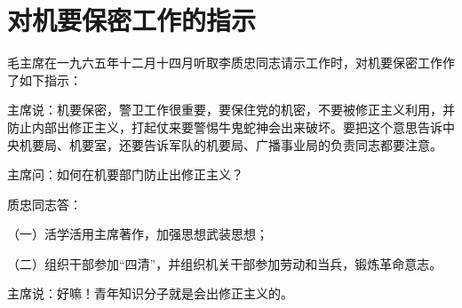 \section[对机要保密工作的指示（一九六五年十二月十四日）]{对机要保密工作的指示}


毛主席在一九六五年十二月十四月听取李质忠同志请示工作时，对机要保密工作作了如下指示：

主席说：机要保密，警卫工作很重要，要保住党的机密，不要被修正主义利用，并防止内部出修正主义，打起仗来要警惕牛鬼蛇神会出来破坏。要把这个意思告诉中央机要局、机要室，还要告诉军队的机要局、广播事业局的负责同志都要注意。

主席问：如何在机要部门防止出修正主义？

质忠同志答：

（一）活学活用主席著作，加强思想武装思想；

（二）组织干部参加“四清”，并组织机关干部参加劳动和当兵，锻炼革命意志。

主席说：好嘛！青年知识分子就是会出修正主义的。

